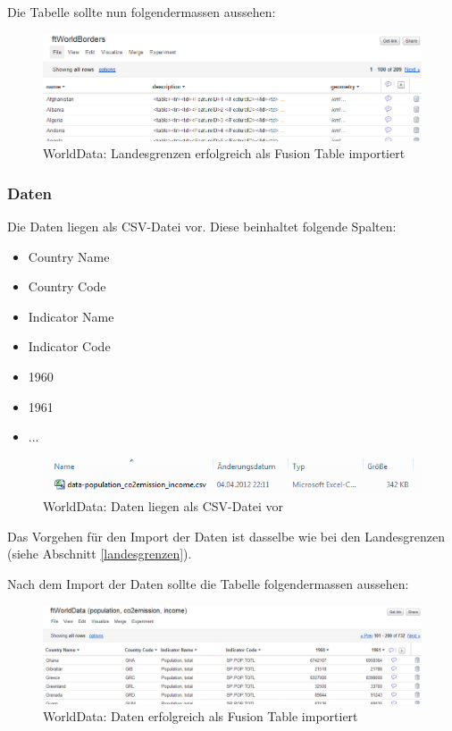 Die Tabelle sollte nun folgendermassen aussehen:

\begin{figure}[H]
	\centering
	\includegraphics[scale=0.65]{images/usecase1-worlddata/documentation/worlddata-worldborders_import_done.png}
	\caption{WorldData: Landesgrenzen erfolgreich als Fusion Table importiert}
	\label{worlddata-worldborders_import_done}
\end{figure}

\subsubsection{Daten}
Die Daten liegen als CSV-Datei vor. Diese beinhaltet folgende Spalten:
\begin{itemize}
\item Country Name
\item Country Code
\item Indicator Name
\item Indicator Code
\item 1960
\item 1961
\item ...
\end{itemize}

\begin{figure}[H]
	\centering
	\includegraphics{images/usecase1-worlddata/documentation/worlddata-data_csv.png}
	\caption{WorldData: Daten liegen als CSV-Datei vor}
	\label{worlddata-data_csv}
\end{figure}

Das Vorgehen für den Import der Daten ist dasselbe wie bei den Landesgrenzen (siehe Abschnitt \ref{landesgrenzen}).

Nach dem Import der Daten sollte die Tabelle folgendermassen aussehen:

\begin{figure}[H]
	\centering
	\includegraphics[scale=0.5]{images/usecase1-worlddata/documentation/worlddata-data_import_done.png}
	\caption{WorldData: Daten erfolgreich als Fusion Table importiert}
	\label{worlddata-data_import_done}
\end{figure}

